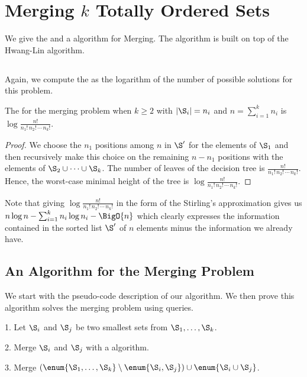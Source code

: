 \section{Merging $k$ Totally Ordered Sets}
\label{tree:merging:kgeq3}

We give the \ITLB and a \BigO{\ITLB} algorithm for Merging. The
algorithm is built on top of the Hwang-Lin algorithm.

\subsection{\ITLB}
\label{tree:merging:kgeq3:ITLB}

Again, we compute the \ITLB as the logarithm of the number of possible solutions
for this problem.
\begin{theorem}
The \ITLB for the merging problem when $k \ge 2$ with $|\S_i| = n_i$ and $n =
\sum_{i=1}^{k} n_i$ is \(\log \frac{n!}{n_1! \, n_2! \, \cdots \, n_k!}\).
\end{theorem}
\begin{proof}
We choose the $n_1$ positions among $n$ in $\S'$ for the elements of
$\S_1$ and then recursively make this choice on the remaining $n - n_1$
positions with the elements of \(\S_2 \cup \dots \cup \S_k\). The number of
leaves of the decision tree is $\frac{n!}{n_1! \, n_2! \, \cdots \, n_k!}$. Hence, the
worst-case minimal height of the tree is $\log \frac{n!}{n_1! \, n_2! \, \cdots
\, n_k!}$.
\end{proof}

Note that giving $\log \frac{n!}{n_1! \, n_2! \, \cdots \, n_k!}$ in the form of the
Stirling's approximation gives us \(n \log n - \sum_{i=1}^{k} n_i \log n_i -
\BigO{n}\)
which clearly expresses the information contained in the sorted list $\S'$ of
$n$ elements minus the information we already have.

\subsection{An Algorithm for the Merging Problem}
\label{tree:merging:kgeq3:alg}

We start with the pseudo-code description of our algorithm. We then prove this
algorithm solves the merging problem using \BigO{\ITLB} queries.
\begin{algorithm}
\item[1.] Let \(\S_i\) and \(\S_j\) be two smallest sets from \(\S_1 ,
\dots , \S_k\).
\item[2.] Merge \(\S_i\) and \(\S_j\) with a \BigO{\ITLB} algorithm.
\item[3.] Merge \((\enum{\S_1 , \dots , \S_k} \setminus \enum{\S_i,\S_j} )
\cup \enum{\S_i \cup \S_j}\).
\end{algorithm}

